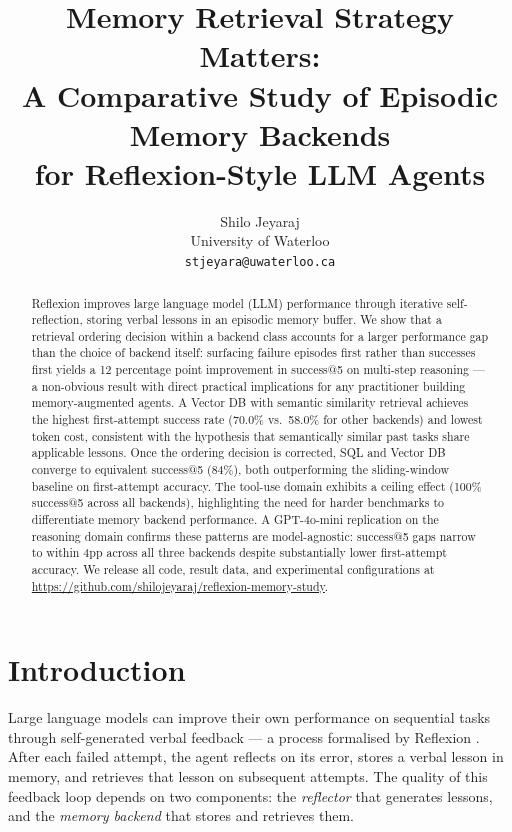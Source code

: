 \documentclass{article}
\title{Memory Retrieval Strategy Matters:\\
A Comparative Study of Episodic Memory Backends\\
for Reflexion-Style LLM Agents}
\author{
  Shilo Jeyaraj \\
  University of Waterloo \\
  \texttt{stjeyara@uwaterloo.ca}
}
\begin{document}
\maketitle

\begin{abstract}
Reflexion \citep{shinn2023reflexion} improves large language model (LLM)
performance through iterative self-reflection, storing verbal lessons in an
episodic memory buffer. We show that a retrieval ordering decision within a
backend class accounts for a larger performance gap than the choice of backend
itself: surfacing failure episodes first rather than successes first yields a
12 percentage point improvement in success@5 on multi-step reasoning ---
a non-obvious result with direct practical implications for any practitioner
building memory-augmented agents. A Vector DB with semantic similarity
retrieval achieves the highest first-attempt success rate (70.0\% vs.\
58.0\% for other backends) and lowest token cost, consistent with the
hypothesis that semantically similar past tasks share applicable lessons.
Once the ordering decision is corrected, SQL and Vector DB converge to
equivalent success@5 (84\%), both outperforming the sliding-window baseline
on first-attempt accuracy. The tool-use domain exhibits a ceiling effect
(100\% success@5 across all backends), highlighting the need for harder
benchmarks to differentiate memory backend performance. A GPT-4o-mini
replication on the reasoning domain confirms these patterns are
model-agnostic: success@5 gaps narrow to within 4pp across all three
backends despite substantially lower first-attempt accuracy. We release
all code, result data, and experimental configurations at
\url{https://github.com/shilojeyaraj/reflexion-memory-study}.
\end{abstract}

\section{Introduction}
\label{sec:intro}

Large language models can improve their own performance on sequential tasks
through self-generated verbal feedback --- a process formalised by Reflexion
\citep{shinn2023reflexion}. After each failed attempt, the agent reflects on
its error, stores a verbal lesson in memory, and retrieves that lesson on
subsequent attempts. The quality of this feedback loop depends on two
components: the \emph{reflector} that generates lessons, and the
\emph{memory backend} that stores and retrieves them.
\end{document}
